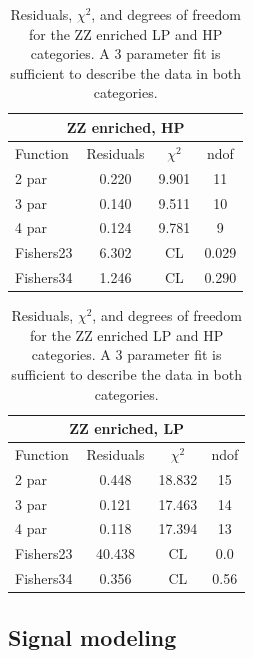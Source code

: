 \begin{table}[h!]
\centering
\begin{tabular}{|l c c c |}
\hline
\multicolumn{4}{|c|}{ZZ enriched, HP}\\
\hline
Function & Residuals & $\chi^2$ & ndof \\
\hline
2 par & 0.220 & 9.901 & 11 \\
3 par & 0.140 & 9.511 & 10 \\
4 par & 0.124 & 9.781 & 9 \\
\hline
\hline
Fishers23 & 6.302& CL & 0.029\\
Fishers34 & 1.246& CL & 0.290\\
\hline
\end{tabular}
\quad
\begin{tabular}{|l c c c |}
\hline
\multicolumn{4}{|c|}{ZZ enriched, LP}\\
\hline
Function & Residuals & $\chi^2$ & ndof \\
\hline
2 par & 0.448 & 18.832 & 15 \\
3 par & 0.121 & 17.463 & 14 \\
4 par & 0.118 & 17.394 & 13 \\
\hline
\hline
Fishers23 & 40.438& CL & 0.0\\
Fishers34 & 0.356& CL & 0.56\\
\hline
\end{tabular}
\caption{Residuals, $\chi^{2}$, and degrees of freedom for the ZZ enriched LP and HP categories. A 3 parameter fit is sufficient to describe the data in both categories.}
\label{tab:ZZ_enriched}
\end{table}

\clearpage
\subsection{Signal modeling}
\label{sec:searchI:sig}

